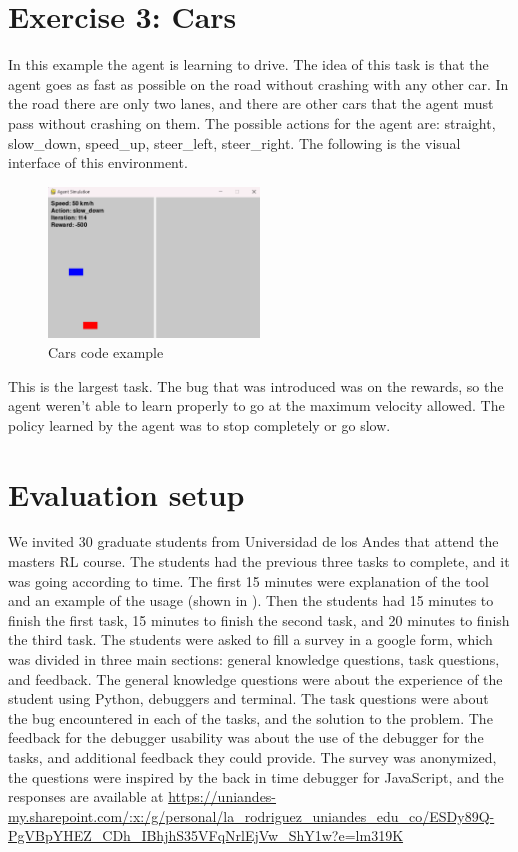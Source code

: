 \section{Exercise 3: Cars}
In this example the agent is learning to drive. The idea of this task is that the agent goes as 
fast as possible on the road without crashing with any other car. In the road there are only two lanes, and there 
are other cars that the agent must pass without crashing on them. The possible actions for the agent are: 
straight, slow\_down, speed\_up, steer\_left, steer\_right. The following is the visual interface of this environment.

\begin{figure}[h]
    \centering
    \includegraphics[width=0.5\textwidth]{figures/cars_example.png}
    \caption{Cars code example}
    \label{fig:cars-code-example}
\end{figure}

This is the largest task. The bug that was introduced was on the rewards, so the agent weren't able to 
learn properly to go at the maximum velocity allowed. The policy learned by the agent was to stop 
completely or go slow. 

\section{Evaluation setup}
\label{sec:evaluation}
We invited 30 graduate students from Universidad de los Andes that attend the masters \ac{RL} course. 
The students had the previous three tasks to complete, and it was going according to time. The first 
15 minutes were explanation of the tool and an example of the usage (shown in ).
Then the students had 15 minutes to finish the first task, 15 minutes to finish the second task, and 
20 minutes to finish the third task. The students were asked to fill a survey in a google 
form, which was divided in three main sections: general knowledge questions, task questions, and feedback.
The general knowledge questions were about the experience of the student using Python, debuggers and 
terminal. The task questions were about the bug encountered in each of the tasks, and the solution 
to the problem. The feedback for the debugger usability was about the use of the debugger for the tasks, 
and additional feedback they could provide. The survey was anonymized, the questions were inspired by the 
back in time debugger for JavaScript\cite{delorean23}, and the responses are available 
at \url{https://uniandes-my.sharepoint.com/:x:/g/personal/la_rodriguez_uniandes_edu_co/ESDy89Q-PgVBpYHEZ_CDh_IBhjhS35VFqNrlEjVw_ShY1w?e=lm319K}


\endinput

